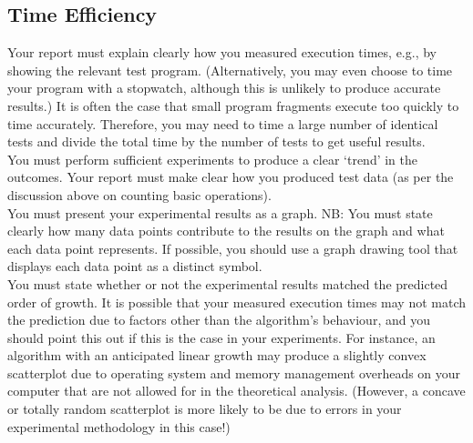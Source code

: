 \documentclass[]{article}
\begin{document}
\subsection{Time Efficiency}
Your report must explain clearly how you measured execution times, e.g., by showing the
relevant test program. (Alternatively, you may even choose to time your program with a
stopwatch, although this is unlikely to produce accurate results.) It is often the case that small
program fragments execute too quickly to time accurately. Therefore, you may need to time a
large number of identical tests and divide the total time by the number of tests to get useful
results.
\\
You must perform sufficient experiments to produce a clear ‘trend’ in the outcomes. Your
report must make clear how you produced test data (as per the discussion above on counting
basic operations).
\\
You must present your experimental results as a graph. NB: You must state clearly how many
data points contribute to the results on the graph and what each data point represents. If
possible, you should use a graph drawing tool that displays each data point as a distinct
symbol.
\\
You must state whether or not the experimental results matched the predicted order of growth.
It is possible that your measured execution times may not match the prediction due to factors
other than the algorithm’s behaviour, and you should point this out if this is the case in your
experiments. For instance, an algorithm with an anticipated linear growth may produce a
slightly convex scatterplot due to operating system and memory management overheads on
your computer that are not allowed for in the theoretical analysis. (However, a concave or
totally random scatterplot is more likely to be due to errors in your experimental methodology
in this case!)
\end{document}
